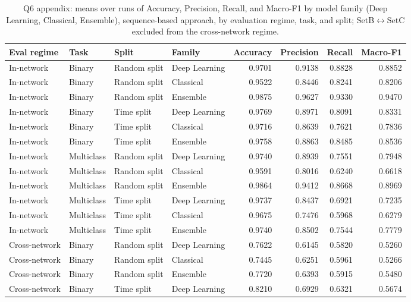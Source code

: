 \begin{table}
\caption{Q6 appendix: means over runs of Accuracy, Precision, Recall, and Macro-F1 by model family (Deep Learning, Classical, Ensemble), sequence-based approach, by evaluation regime, task, and split; SetB$\leftrightarrow$SetC excluded from the cross-network regime.}
\label{tab:q6_appendix_overall}
\begin{tabular}{llllrrrr}
\toprule
Eval regime & Task & Split & Family & Accuracy & Precision & Recall & Macro-F1 \\
\midrule
In-network & Binary & Random split & Deep Learning & 0.9701 & 0.9138 & 0.8828 & 0.8852 \\
In-network & Binary & Random split & Classical & 0.9522 & 0.8446 & 0.8241 & 0.8206 \\
In-network & Binary & Random split & Ensemble & 0.9875 & 0.9627 & 0.9330 & 0.9470 \\
In-network & Binary & Time split & Deep Learning & 0.9769 & 0.8971 & 0.8091 & 0.8331 \\
In-network & Binary & Time split & Classical & 0.9716 & 0.8639 & 0.7621 & 0.7836 \\
In-network & Binary & Time split & Ensemble & 0.9758 & 0.8863 & 0.8485 & 0.8536 \\
In-network & Multiclass & Random split & Deep Learning & 0.9740 & 0.8939 & 0.7551 & 0.7948 \\
In-network & Multiclass & Random split & Classical & 0.9591 & 0.8016 & 0.6240 & 0.6618 \\
In-network & Multiclass & Random split & Ensemble & 0.9864 & 0.9412 & 0.8668 & 0.8969 \\
In-network & Multiclass & Time split & Deep Learning & 0.9737 & 0.8437 & 0.6921 & 0.7235 \\
In-network & Multiclass & Time split & Classical & 0.9675 & 0.7476 & 0.5968 & 0.6279 \\
In-network & Multiclass & Time split & Ensemble & 0.9740 & 0.8502 & 0.7544 & 0.7779 \\
Cross-network & Binary & Random split & Deep Learning & 0.7622 & 0.6145 & 0.5820 & 0.5260 \\
Cross-network & Binary & Random split & Classical & 0.7445 & 0.6251 & 0.5961 & 0.5266 \\
Cross-network & Binary & Random split & Ensemble & 0.7720 & 0.6393 & 0.5915 & 0.5480 \\
Cross-network & Binary & Time split & Deep Learning & 0.8210 & 0.6929 & 0.6321 & 0.5674 \\

\end{tabular}
\end{table}
